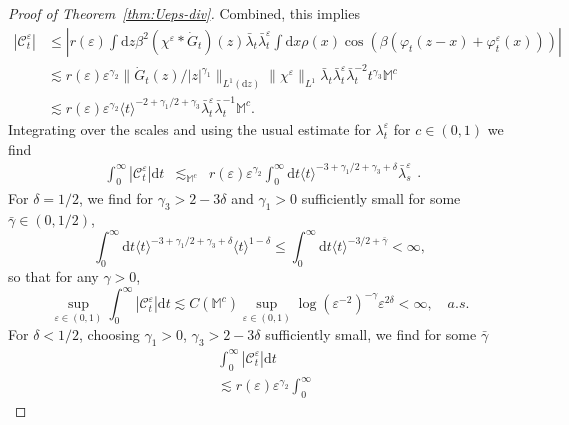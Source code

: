 \documentclass[11pt, a4paper]{scrartcl}
\numberwithin{equation}{section}
\theoremstyle{plain}
\theoremstyle{remark}
\newcommand{\mathd}{\mathrm{d}}
\begin{document}
\begin{proof}[Proof of Theorem~\ref{thm:Ueps-div}]
	Combined, this implies
	\[ \begin{aligned}
			| \mathcal{C}^{\varepsilon}_t | & \leqslant  \left| r (\varepsilon)
			\int \mathd z \beta^2 (\chi^{\varepsilon} \ast \dot{G}_t ) (z)
			\bar{\lambda}_t \bar{\lambda}_t^{\varepsilon} \int \mathd x \rho (x) \cos (\beta
			(\varphi_t (z - x) + \varphi_t^{\varepsilon} (x))) \right|                                            \\
			                                & \lesssim  r (\varepsilon) \varepsilon^{\gamma_2} \| \dot{G}_t (z) /
			| z |^{\gamma_1} \|_{L^1 (\mathd z)} \| \chi^{\varepsilon} \|_{L^1}
			\bar{\lambda}_t \bar{\lambda}_t^{\varepsilon} \bar{\lambda}_t^{- 2} t^{\gamma_3}
			\mathbb{M}^c                                                                                          \\
			                                & \lesssim  r (\varepsilon) \varepsilon^{\gamma_2} \langle t
			\rangle^{- 2 + \gamma_1 / 2 + \gamma_3} \bar{\lambda}_t^{\varepsilon}
			\bar{\lambda}_t^{- 1} \mathbb{M}^c .
		\end{aligned} \]
	Integrating over the scales and using the usual estimate for
	$\lambda^{\varepsilon}_t$ for $c \in (0, 1)$ we find
	\[ \begin{aligned}
			\int_0^{\infty} | \mathcal{C}^{\varepsilon}_t | \mathd t &
			\lesssim_{\mathbb{M}^c}                                  & r (\varepsilon) \varepsilon^{\gamma_2}
			\int_0^{\infty} \mathd t \langle t \rangle^{- 3 + \gamma_1 / 2 +
				\gamma_3 + \delta} \bar{\lambda}_s^{\varepsilon}
		\end{aligned} . \]
	For $\delta = 1 / 2$, we find for $\gamma_3 > 2 - 3 \delta$ and $\gamma_1 >
		0$ sufficiently small for some $\bar{\gamma} \in (0, 1 / 2)$,
	\[ \int_0^{\infty} \mathd t \langle t \rangle^{- 3 + \gamma_1 / 2 +
			\gamma_3 + \delta} \langle t \rangle^{1 - \delta} \leqslant
		\int_0^{\infty} \mathd t \langle t \rangle^{- 3 / 2 + \bar{\gamma}} <
		\infty, \]
	so that for any $\gamma > 0$,
	\[ \sup_{\varepsilon \in (0, 1)} \int_0^{\infty} |
		\mathcal{C}^{\varepsilon}_t | \mathd t \lesssim C (\mathbb{M}^c)
		\sup_{\varepsilon \in (0, 1)} \log (\varepsilon^{- 2})^{- \gamma}
		\varepsilon^{2 \delta} < \infty, \quad a.s. \]
	For $\delta < 1 / 2$, choosing $\gamma_1 > 0$, $\gamma_3 > 2 - 3 \delta$
	sufficiently small, we find for some $\bar{\gamma}$
	\[ \begin{aligned}
			 & \int_0^{\infty} | \mathcal{C}^{\varepsilon}_t | \mathd t         \\
			 & \lesssim  r (\varepsilon) \varepsilon^{\gamma_2} \int_0^{\infty}

\end{aligned}\]
\end{proof}
\end{document}

